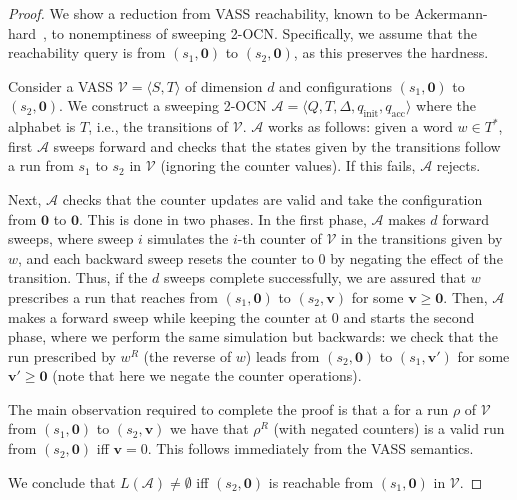 \documentclass[USenglish]{lipics-v2021}
\newcommand{\shtodo}[1]{\todo[color=cyan!25,size=\small]{SH: #1}}
\newcommand{\tup}[1]{\langle #1 \rangle}
\newcommand{\initstate}{q_{\mathrm{init}}}
\newcommand{\accstate}{q_{\mathrm{acc}}}
\renewcommand{\vec}[1]{\boldsymbol{#1}}
\newcommand{\cA}{\mathcal{A}}
\newcommand{\cV}{\mathcal{V}}
\begin{document}
\begin{proof}
	We show a reduction from VASS reachability, known to be
	Ackermann-hard~\cite{leroux2022reachability,czerwinski2022reachability}, to
	nonemptiness of sweeping 2-OCN. Specifically, we assume that the
	reachability query is from $(s_1,\vec{0})$ to $(s_2,\vec{0})$, as this
	preserves the hardness.
	
	Consider a VASS $\cV=\tup{S,T}$ of dimension $d$ and configurations
	$(s_1,\vec{0})$ to $(s_2,\vec{0})$.  We construct a sweeping 2-OCN
	$\cA=\tup{Q,T,\Delta,\initstate,\accstate}$ where the alphabet is $T$, i.e., the
	transitions of $\cV$. $\cA$ works as follows: given a word $w\in T^*$, first
	$\cA$ sweeps forward and checks that the states given by the transitions
	follow a run from $s_1$ to $s_2$ in $\cV$ (ignoring the counter values). If
	this fails, $\cA$ rejects.
	
	Next, $\cA$ checks that the counter updates are valid and take the
	configuration from $\vec{0}$ to $\vec{0}$. This is done in two phases. In
	the first phase, $\cA$ makes $d$ forward sweeps, where sweep $i$ simulates
	the $i$-th counter of $\cV$ in the transitions given by $w$, and each
	backward sweep resets the counter to $0$ by negating the effect of the
	transition.  Thus, if the $d$ sweeps complete successfully, we are assured
	that $w$ prescribes a run that reaches from $(s_1,\vec{0})$ to
	$(s_2,\vec{v})$ for some $\vec{v}\ge \vec{0}$.  Then, $\cA$ makes a forward
	sweep while keeping the counter at $0$ and starts the second phase, where we
	perform the same simulation but backwards: we check that the run prescribed
	by $w^R$ (the reverse of $w$) leads from $(s_2,\vec{0})$ to $(s_1,\vec{v'})$
	for some $\vec{v'}\ge\vec{0}$ (note that here we negate the counter
	operations).
	
	The main observation required to complete the proof is that a for a run $\rho$
	of $\cV$ from $(s_1,\vec{0})$ to $(s_2,\vec{v})$ we have that $\rho^R$ (with
	negated counters) is a valid run from $(s_2,\vec{0})$ iff $\vec{v}=0$. This
	follows immediately from the VASS semantics.
	
	We conclude that $L(\cA)\neq \emptyset$ iff $(s_2,\vec{0})$ is reachable from
	$(s_1,\vec{0})$ in $\cV$.
\end{proof}
\end{document}

